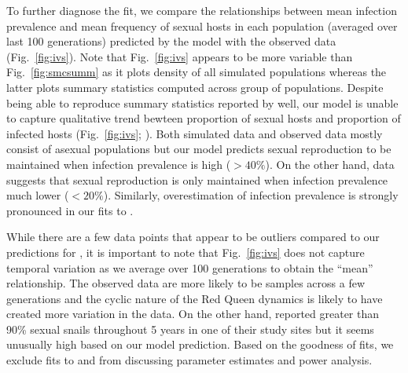 \documentclass{article}\usepackage[]{graphicx}\usepackage[]{color}
\newcommand{\fref}[1]{Fig.~\ref{fig:#1}}
\begin{document}
To further diagnose the fit, we compare the relationships between mean infection prevalence and mean frequency of sexual hosts in each population (averaged over last 100 generations) predicted by the model with the observed data (\fref{ivs}).
Note that \fref{ivs} appears to be more variable than \fref{smcsumm} as it plots density of all simulated populations whereas the latter plots summary statistics computed across group of populations.
Despite being able to reproduce summary statistics reported by \cite{dagan2013clonal} well, 
our model is unable to capture qualitative trend bewteen proportion of sexual hosts and proportion of infected hosts (\fref{ivs}; \cite{dagan2013clonal}).
Both simulated data and observed data mostly consist of asexual populations
but our model predicts sexual reproduction to be maintained when infection prevalence is high ($> 40\%$). 
On the other hand, \cite{dagan2013clonal} data suggests that sexual reproduction is only maintained when infection prevalence much lower ($< 20\%$).
Similarly, overestimation of infection prevalence is strongly pronounced in our fits to \cite{mckone2016fine}.

While there are a few data points that appear to be outliers compared to our predictions for \cite{vergara2014infection},
it is important to note that \fref{ivs} does not capture temporal variation as we average over 100 generations to obtain the ``mean'' relationship.
The observed data are more likely to be samples across a few generations and the cyclic nature of the Red Queen dynamics is likely to have created more variation in the data.
On the other hand, \cite{vergara2014infection} reported greater than 90\% sexual snails throughout 5 years in one of their study sites but it seems unusually high based on our model prediction.
Based on the goodness of fits, we exclude fits to \cite{dagan2013clonal} and \cite{mckone2016fine} from discussing parameter estimates and power analysis.
\end{document}
